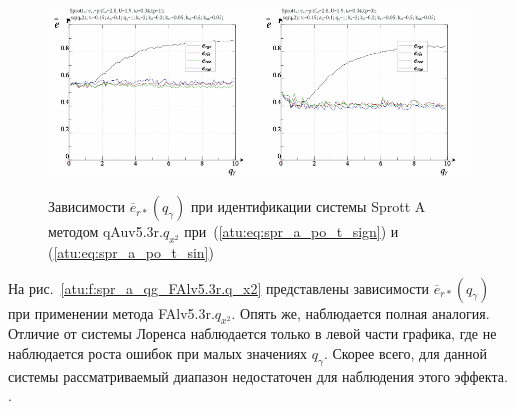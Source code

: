 \begin{figure}[h!]
  \centerline{
    \includegraphics[width=0.49\textwidth]{p/cha/spr_a/qAuv5.3r/sprott_a_qAuv5_3r_qx2-p_qgamma_e_sign.png}
    \hfill
    \includegraphics[width=0.49\textwidth]{p/cha/spr_a/qAuv5.3r/sprott_a_qAuv5_3r_qx2-p_qgamma_e_sin.png}
  }
  \caption{Зависимости $\overline{e}_{r*}(q_\gamma)$ при идентификации системы Sprott A методом qAuv5.3r.$q_{x^2}$
   при~(\ref{atu:eq:spr_a_po_t_sign}) и (\ref{atu:eq:spr_a_po_t_sin})}
  \label{atu:f:spr_a_qg_qAuv5.3r.q_x2}
\end{figure}

На рис.~\ref{atu:f:spr_a_qg_FAlv5.3r.q_x2} представлены зависимости
$\overline{e}_{r*}(q_\gamma)$ при применении метода FAlv5.3r.$q_{x^2}$.
Опять же, наблюдается полная аналогия. Отличие от системы Лоренса наблюдается только
в левой части графика, где не наблюдается роста ошибок при
малых значениях $q_\gamma$. Скорее всего, для данной системы
рассматриваемый диапазон недостаточен для наблюдения этого эффекта. .

